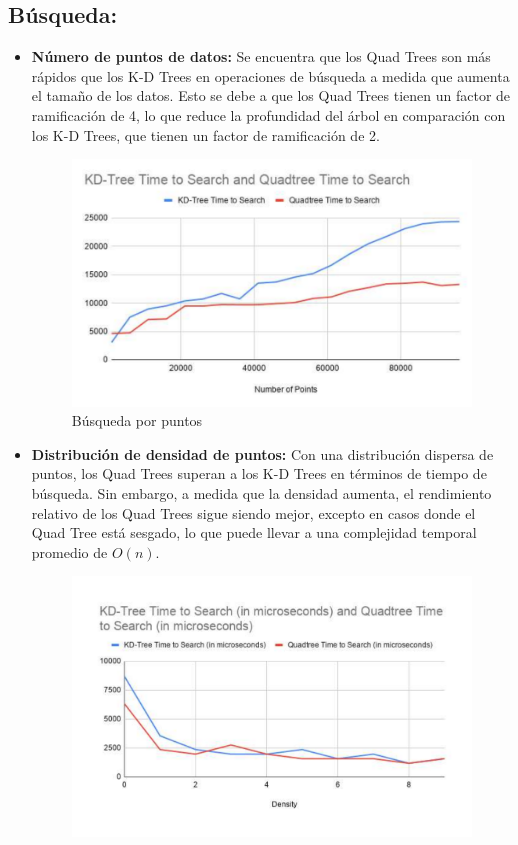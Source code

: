 \documentclass[9pt,a4paper,twoside]{rho-class/rho}
\begin{document}
        \subsection*{Búsqueda:}
            \begin{itemize}
            \item \textbf{Número de puntos de datos:} Se encuentra que los Quad Trees son más rápidos que los K-D Trees en operaciones de búsqueda a medida que aumenta el tamaño de los datos. Esto se debe a que los Quad Trees tienen un factor de ramificación de 4, lo que reduce la profundidad del árbol en comparación con los K-D Trees, que tienen un factor de ramificación de 2.\\
                \begin{figure}[h]
                \centering
                \includegraphics[width=\linewidth]{figures/Search1.pdf}
                \caption{Búsqueda por puntos\cite{amay12_spatialsearch}}
                \label{fig:search_p_p_figure}
            \end{figure}
            \item \textbf{Distribución de densidad de puntos:} Con una distribución dispersa de puntos, los Quad Trees superan a los K-D Trees en términos
            de tiempo de búsqueda. Sin embargo, a medida que la densidad aumenta, el rendimiento relativo de los Quad Trees sigue siendo mejor, excepto en casos donde el Quad Tree está sesgado, lo que puede llevar a una complejidad temporal promedio de $O(n)$.\\
            \begin{figure}[h]
                \centering
                \includegraphics[width=\linewidth]{figures/Search2-density.pdf}

\end{figure}
\end{itemize}
\end{document}
